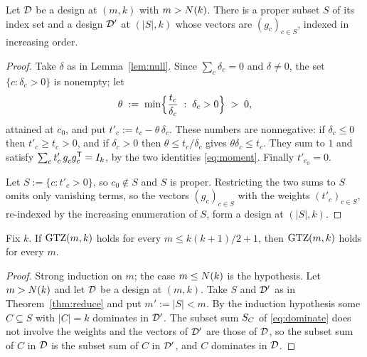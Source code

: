 \begin{theorem}[Lean]\label{thm:reduce}
Let $\mathcal{D}$ be a design at $(m,k)$ with $m>N(k)$.  There is a proper subset
$S$ of its index set and a design $\mathcal{D}'$ at $(\lvert S\rvert,k)$ whose
vectors are $(g_c)_{c\in S}$, indexed in increasing order.
\end{theorem}

\begin{proof}
Take $\delta$ as in Lemma~\ref{lem:null}.  Since $\sum_c\delta_c=0$ and
$\delta\ne0$, the set $\{c:\delta_c>0\}$ is nonempty; let
\[
  \theta\;:=\;\min\Bigl\{\frac{t_c}{\delta_c}\;:\;\delta_c>0\Bigr\}\;>\;0 ,
\]
attained at $c_0$, and put $t'_c:=t_c-\theta\,\delta_c$.  These numbers are
nonnegative: if $\delta_c\le0$ then $t'_c\ge t_c>0$, and if $\delta_c>0$
then $\theta\le t_c/\delta_c$ gives $\theta\delta_c\le t_c$.  They sum to $1$ and
satisfy $\sum_ct'_c\,g_c^{\vphantom{\mathsf{T}}}g_c\tp=I_k$, by the two identities
\eqref{eq:moment}.  Finally $t'_{c_0}=0$.

Let $S:=\{c:t'_c>0\}$, so $c_0\notin S$ and $S$ is proper.
Restricting the two sums to $S$ omits only vanishing terms, so the
vectors $(g_c)_{c\in S}$ with the weights $(t'_c)_{c\in S}$, re-indexed by
the increasing enumeration of $S$, form a design at $(\lvert S\rvert,k)$.
\end{proof}

\begin{theorem}[Lean]\label{thm:window}
Fix $k$.  If $\mathrm{GTZ}(m,k)$ holds for every $m\le k(k+1)/2+1$, then
$\mathrm{GTZ}(m,k)$ holds for every $m$.
\end{theorem}

\begin{proof}
Strong induction on $m$; the case $m\le N(k)$ is the hypothesis.  Let
$m>N(k)$ and let $\mathcal{D}$ be a design at $(m,k)$.  Take $S$ and $\mathcal{D}'$ as in
Theorem~\ref{thm:reduce} and put $m':=\lvert S\rvert<m$.  By the induction
hypothesis some $C\subseteq S$ with $\lvert C\rvert=k$ dominates in $\mathcal{D}'$.
The subset sum
$S_{C}$ of \eqref{eq:dominate} does not involve the weights and the vectors
of $\mathcal{D}'$ are those of $\mathcal{D}$, so the subset sum of $C$ in $\mathcal{D}$ is the subset
sum of $C$ in $\mathcal{D}'$, and $C$ dominates in $\mathcal{D}$.
\end{proof}

